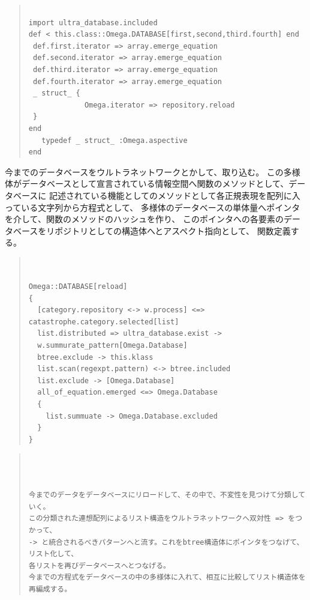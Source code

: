 \documentclass{jsarticle}
\begin{document}
   
\begin{quote}
\setlength{\baselineskip}{12pt}
\begin{verbatim}

import ultra_database.included
def < this.class::Omega.DATABASE[first,second,third.fourth] end
 def.first.iterator => array.emerge_equation
 def.second.iterator => array.emerge_equation
 def.third.iterator => array.emerge_equation
 def.fourth.iterator => array.emerge_equation
 _ struct_ {
             Omega.iterator => repository.reload
 } 
end
   typedef _ struct_ :Omega.aspective
end
 \end{verbatim}
\end{quote}

今までのデータベースをウルトラネットワークとかして、取り込む。
この多様体がデータベースとして宣言されている情報空間へ関数のメソッドとして、データベースに
記述されている機能としてのメソッドとして各正規表現を配列に入っている文字列から方程式として、
多様体のデータベースの単体量へポインタを介して、関数のメソッドのハッシュを作り、
このポインタへの各要素のデータベースをリポジトリとしての構造体へとアスペクト指向として、
関数定義する。

\begin{quote}
\setlength{\baselineskip}{12pt}
\begin{verbatim}


Omega::DATABASE[reload]
{ 
  [category.repository <-> w.process] <=> catastrophe.category.selected[list]
  list.distributed => ultra_database.exist -> 
  w.summurate_pattern[Omega.Database]
  btree.exclude -> this.klass
  list.scan(regexpt.pattern) <-> btree.included
  list.exclude -> [Omega.Database]
  all_of_equation.emerged <=> Omega.Database
  {
    list.summuate -> Omega.Database.excluded
  }
}
\end{verbatim}
\end{quote}

\begin{quote}
\setlength{\baselineskip}{12pt}
\begin{verbatim}

  

今までのデータをデータベースにリロードして、その中で、不変性を見つけて分類していく。
この分類された連想配列によるリスト構造をウルトラネットワークへ双対性 => をつかって、
-> と統合されるべきパターンへと流す。これをbtree構造体にポインタをつなげて、リスト化して、
各リストを再びデータベースへとつなげる。
今までの方程式をデータベースの中の多様体に入れて、相互に比較してリスト構造体を再編成する。

\end{verbatim}
\end{quote}
\end{document}
